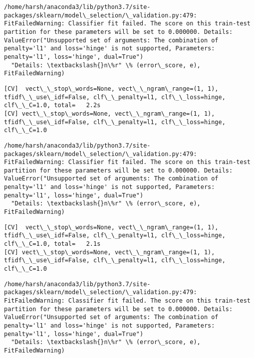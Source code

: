 \documentclass[11pt]{article}
\begin{document}
    \begin{Verbatim}[commandchars=\\\{\}]
/home/harsh/anaconda3/lib/python3.7/site-packages/sklearn/model\_selection/\_validation.py:479: FitFailedWarning: Classifier fit failed. The score on this train-test partition for these parameters will be set to 0.000000. Details: 
ValueError("Unsupported set of arguments: The combination of penalty='l1' and loss='hinge' is not supported, Parameters: penalty='l1', loss='hinge', dual=True")
  "Details: \textbackslash{}n\%r" \% (error\_score, e), FitFailedWarning)

    \end{Verbatim}

    \begin{Verbatim}[commandchars=\\\{\}]
[CV]  vect\_\_stop\_words=None, vect\_\_ngram\_range=(1, 1), tfidf\_\_use\_idf=False, clf\_\_penalty=l1, clf\_\_loss=hinge, clf\_\_C=1.0, total=   2.2s
[CV] vect\_\_stop\_words=None, vect\_\_ngram\_range=(1, 1), tfidf\_\_use\_idf=False, clf\_\_penalty=l1, clf\_\_loss=hinge, clf\_\_C=1.0 

    \end{Verbatim}

    \begin{Verbatim}[commandchars=\\\{\}]
/home/harsh/anaconda3/lib/python3.7/site-packages/sklearn/model\_selection/\_validation.py:479: FitFailedWarning: Classifier fit failed. The score on this train-test partition for these parameters will be set to 0.000000. Details: 
ValueError("Unsupported set of arguments: The combination of penalty='l1' and loss='hinge' is not supported, Parameters: penalty='l1', loss='hinge', dual=True")
  "Details: \textbackslash{}n\%r" \% (error\_score, e), FitFailedWarning)

    \end{Verbatim}

    \begin{Verbatim}[commandchars=\\\{\}]
[CV]  vect\_\_stop\_words=None, vect\_\_ngram\_range=(1, 1), tfidf\_\_use\_idf=False, clf\_\_penalty=l1, clf\_\_loss=hinge, clf\_\_C=1.0, total=   2.1s
[CV] vect\_\_stop\_words=None, vect\_\_ngram\_range=(1, 1), tfidf\_\_use\_idf=False, clf\_\_penalty=l1, clf\_\_loss=hinge, clf\_\_C=1.0 

    \end{Verbatim}

    \begin{Verbatim}[commandchars=\\\{\}]
/home/harsh/anaconda3/lib/python3.7/site-packages/sklearn/model\_selection/\_validation.py:479: FitFailedWarning: Classifier fit failed. The score on this train-test partition for these parameters will be set to 0.000000. Details: 
ValueError("Unsupported set of arguments: The combination of penalty='l1' and loss='hinge' is not supported, Parameters: penalty='l1', loss='hinge', dual=True")
  "Details: \textbackslash{}n\%r" \% (error\_score, e), FitFailedWarning)

    \end{Verbatim}
\end{document}
